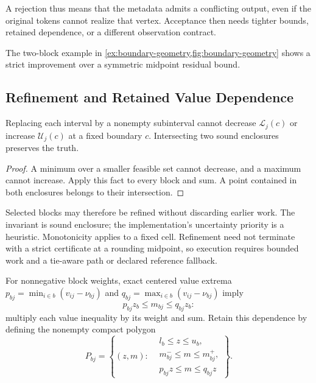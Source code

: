 A rejection thus means that the metadata admits a conflicting output, even
if the original tokens cannot realize that vertex. Acceptance then needs
tighter bounds, retained dependence, or a different observation contract.

The two-block example in \cref{ex:boundary-geometry,fig:boundary-geometry}
shows a strict improvement over a symmetric midpoint residual bound.

\subsection{Refinement and Retained Value Dependence}

\begin{theorem}\label{thm:refinement}
Replacing each interval by a nonempty subinterval cannot decrease
$\mathcal L_j(c)$ or increase $\mathcal U_j(c)$ at a fixed boundary $c$.
Intersecting two sound enclosures preserves the truth.
\end{theorem}
\begin{proof}
A minimum over a smaller feasible set cannot decrease, and a maximum cannot
increase. Apply this fact to every block and sum. A point contained in both
enclosures belongs to their intersection.
\end{proof}

Selected blocks may therefore be refined without discarding earlier work.
The invariant is sound enclosure; the implementation's uncertainty priority
is a heuristic. Monotonicity applies to a fixed cell. Refinement need not
terminate with a strict certificate at a rounding midpoint, so execution
requires bounded work and a tie-aware path or declared reference fallback.

For nonnegative block weights, exact centered value extrema
$p_{bj}=\min_{i\in b}(v_{ij}-\nu_{bj})$ and
$q_{bj}=\max_{i\in b}(v_{ij}-\nu_{bj})$ imply
\begin{equation}
 p_{bj}z_b\le m_{bj}\le q_{bj}z_b:
 \label{eq:value-coupling}
\end{equation}
multiply each value inequality by its weight and sum. Retain this dependence
by defining the nonempty compact polygon
\begin{equation}
 P_{bj}=\left\{(z,m):\begin{aligned}
 &l_b\le z\le u_b,\\
 &m^-_{bj}\le m\le m^+_{bj},\\
 &p_{bj}z\le m\le q_{bj}z
 \end{aligned}\right\}.
 \label{eq:coupled-polygon}
\end{equation}

